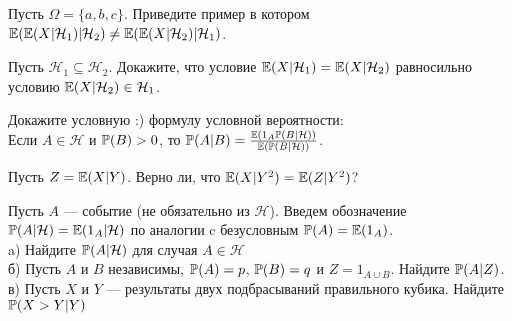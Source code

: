 \begin{problem}
Пусть $\Omega=\{a,b,c\}$. Приведите пример в котором
$\E(\E(X|\mathcal{H}_{1})|\mathcal{H}_{2})\neq
\E(\E(X|\mathcal{H}_{2})|\mathcal{H}_{1})$. 
\end{problem} 
\begin{solution} 

\end{solution}

\begin{problem}
Пусть $\mathcal{H}_{1} \subseteq \mathcal{H}_{2}$. Докажите, что
условие $\E(X|\mathcal{H}_{1})=\E(X|\mathcal{H}_{2})$ равносильно
условию $\E(X|\mathcal{H}_{2})\in \mathcal{H}_{1}$. 
\end{problem} 
\begin{solution} 

\end{solution}

\begin{problem}
Докажите условную :) формулу условной вероятности: \\
Если $A\in \mathcal{H}$ и $\P(B)>0$, то
$\P(A|B)=\frac{\E(1_{A}\P(B|\mathcal{H}))}{\E(\P(B|\mathcal{H}))}$. 
\end{problem} 
\begin{solution} 

\end{solution}

\begin{problem}
Пусть $Z=\E(X|Y)$. Верно ли, что $\E(X|Y^{2})=\E(Z|Y^{2})$? 
\end{problem} 
\begin{solution} 

\end{solution}

\begin{problem}
Пусть $A$ --- событие (не обязательно из $\mathcal{H}$). Введем
обозначение $\P(A|\mathcal{H})=\E(1_A|\mathcal{H})$ по аналогии
c безусловным $\P(A)=\E(1_{A})$. \\
a) Найдите $\P(A|\mathcal{H})$ для случая $A\in\mathcal{H}$ \\
б) Пусть $A$ и $B$ независимы, $\P(A)=p$, $\P(B)=q$ и $Z=1_{A\cup B}$. Найдите $\P(A|Z)$. \\
в) Пусть $X$ и $Y$ --- результаты двух подбрасываний правильного
кубика. Найдите $\P(X>Y|Y)$ 
\end{problem} 
\begin{solution} 

\end{solution}

